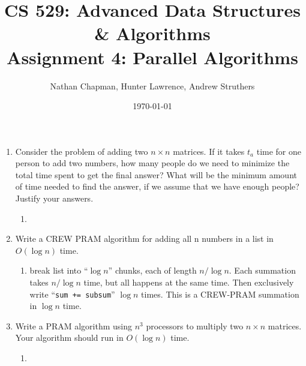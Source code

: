 \documentclass{article}
\title{\vspace*{-0.625in}CS 529: Advanced Data Structures \& Algorithms \\ Assignment 4: Parallel Algorithms}
\author{Nathan Chapman, Hunter Lawrence, Andrew Struthers}
\date{\today}
\renewcommand{\_}{\ifincsname_\else\legacyunderscore\fi}
\begin{document}
    \maketitle

\begin{enumerate}
	\item Consider the problem of adding two $n\times n$ matrices. If it takes $t_a$ time for one person to add two numbers, how many people do we need to minimize the total time spent to get the final answer? What will be the minimum amount of time needed to find the answer, if we assume that we have enough people? Justify your answers.
	\begin{enumerate}
		\item
	\end{enumerate}

	\item Write a CREW PRAM algorithm for adding all n numbers in a list in $O(\log n)$ time.
	\begin{enumerate}
		\item break list into ``$\log n$'' chunks, each of length $n / \log n$.  Each summation takes $n / \log n$ time, but all happens at the same time.  Then exclusively write ``\verb|sum += subsum|'' $\log n$ times.  This is a CREW-PRAM summation in $\log n$ time.
	\end{enumerate}

	\item Write a PRAM algorithm using $n^3$ processors to multiply two $n\times n$ matrices. Your algorithm should run in $O(\log n)$ time.
	\begin{enumerate}
		\item
	\end{enumerate}

\end{enumerate}
\end{document}
